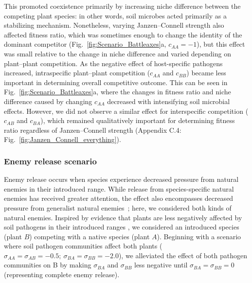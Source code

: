 This promoted coexistence primarily by increasing niche difference between the competing plant species: in other words, soil microbes acted primarily as a stabilizing mechanism. Nonetheless, varying Janzen--Connell strength also affected fitness ratio, which was sometimes enough to change the identity of the dominant competitor (Fig.~\ref{fig:Scenario_Battleaxes}a, $c_{AA} = -1$), but this effect was small relative to the change in niche difference and varied depending on plant--plant competition. As the negative effect of host-specific pathogens increased, intraspecific plant--plant competition ($c_{AA}$ and $c_{BB}$) became less important in determining overall competitive outcome. This can be seen in Fig.~\ref{fig:Scenario_Battleaxes}a, where the changes in fitness ratio and niche difference caused by changing $c_{AA}$ decreased with intensifying soil microbial effects. However, we did not observe a similar effect for interspecific competition ($c_{AB}$ and $c_{BA}$), which remained qualitatively important for determining fitness ratio regardless of Janzen--Connell strength (Appendix C.4: Fig.~\ref{fig:Janzen_Connell_everything}).
\par



\subsubsection*{Enemy release scenario}
Enemy release occurs when species experience decreased pressure from natural enemies in their introduced range. While release from species-specific natural enemies has received greater attention, the effect also encompasses decreased pressure from generalist natural enemies~\citep{Keane2002}; here, we considered both kinds of natural enemies. Inspired by evidence that plants are less negatively affected by soil pathogens in their introduced ranges \citep{Reinhart2006}, we considered an introduced species (plant $B$) competing with a native species (plant $A$). Beginning with a scenario where soil pathogen communities affect both plants ($\sigma_{AA} = \sigma_{AB} = -0.5;\ \sigma_{BA} = \sigma_{BB} = -2.0$), we alleviated the effect of both pathogen communities on B by making $\sigma_{BA}$ and $\sigma_{BB}$ less negative until $\sigma_{BA} = \sigma_{BB} = 0$ (representing complete enemy release).
\par


